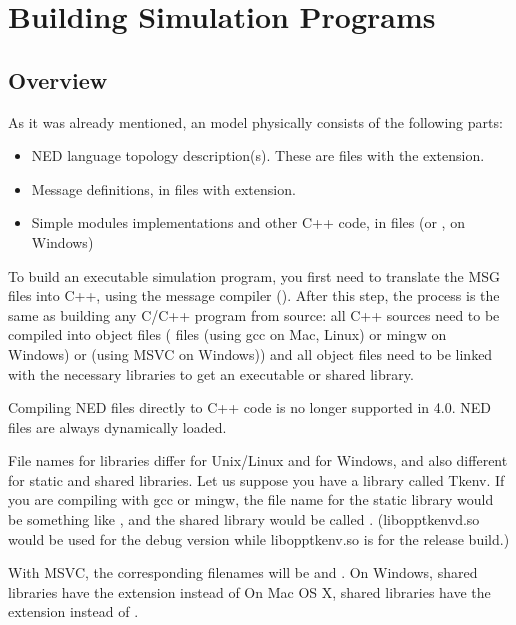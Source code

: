 \chapter{Building Simulation Programs}
\label{cha:building-simulation-programs}

\section{Overview}

As it was already mentioned, an {\opp} model physically consists of
the following parts:

\begin{itemize}
  \item{NED language topology description(s). These
      are files with the  extension.}
  \item{Message definitions, in files
      with  extension.}
  \item{Simple modules implementations and other C++ code, in 
        files (or , on Windows)}
\end{itemize}


To build an executable simulation program,
you first need to translate the MSG files
into C++, using the message compiler ().
After this step, the process is the same as building any C/C++
program from source: all C++ sources need to be compiled into object files
( files (using gcc on Mac, Linux) or mingw on Windows)
\ifcommercial or  (using MSVC on Windows)) \fi
and all object files need to be linked with the necessary libraries to get
an executable or shared library.

\begin{note}
Compiling NED files directly to C++ code is no longer supported in
{\opp} 4.0. NED files are always dynamically loaded.
\end{note}

File names for libraries differ for Unix/Linux and for Windows,
and also different for static and shared libraries.
Let us suppose you have a library called Tkenv.
If you are compiling with gcc or mingw, the file name for the static library
would be something like ,
and the shared library would be called .
(libopptkenvd.so would be used for the debug version while libopptkenv.so
is for the release build.)

\begin{note}
\ifcommercial With MSVC, the corresponding filenames will be  and .\fi
On Windows, shared libraries have the  extension instead of 
On Mac OS X, shared libraries have the  extension instead of .
\end{note}

